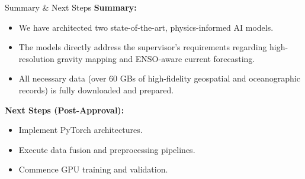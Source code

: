 \documentclass[aspectratio=169, xcolor=table]{beamer}
\begin{document}
\begin{frame}{Summary \& Next Steps}
    \textbf{Summary:}
    \begin{itemize}
        \item We have architected two state-of-the-art, physics-informed AI models.
        \item The models directly address the supervisor's requirements regarding high-resolution gravity mapping and ENSO-aware current forecasting.
        \item All necessary data (over 60 GBs of high-fidelity geospatial and oceanographic records) is fully downloaded and prepared.
    \end{itemize}
    \vspace{0.5cm}
    \textbf{Next Steps (Post-Approval):}
    \begin{itemize}
        \item Implement PyTorch architectures.
        \item Execute data fusion and preprocessing pipelines.
        \item Commence GPU training and validation.
    \end{itemize}
\end{frame}
\end{document}

